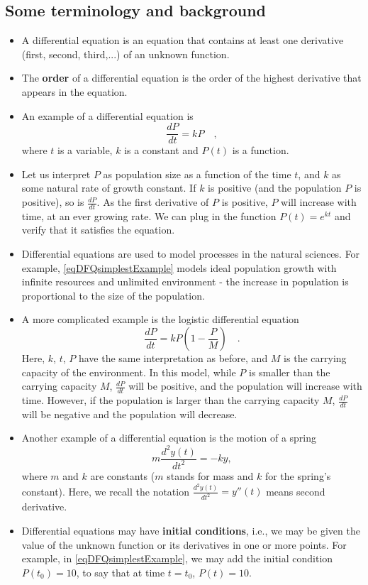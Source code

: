 \documentclass[12pt]{book}
\renewcommand{\emph}{\textbf}
\begin{document}
\subsection{Some terminology and background}
\begin{itemize}
\item A differential equation is an equation that contains at least one derivative (first, second, third,...) of an unknown function. 
\item The \emph{order} of a differential equation is the order of the highest derivative that appears in the equation.
\item An example of a differential equation is
\begin{equation}\label{eqDFQsimplestExample}
\frac{dP}{dt} = k P\quad ,
\end{equation}
where $t$ is a variable, $k$ is a constant and $P(t)$ is a function.
\item Let us interpret $P$ as population size as a function of the time $t$, and $k$ as some natural rate of growth constant. If $k$ is positive (and the population $P$ is positive), so is $\frac{d P}{dt}$. As the first derivative of $P$ is positive, $P$ will increase with time, at an ever growing rate. We can plug in the function $P(t)= e^{k t}$ and verify that it satisfies the equation.
\item Differential equations are used to model processes in the natural sciences. For example, \ref{eqDFQsimplestExample} models ideal population growth with infinite resources and unlimited environment - the increase in population is proportional to the size of the population.
\item A more complicated example is the logistic differential equation 
\[
\frac{d P }{dt} = k P(1- \frac{P}{M})\quad.
\]
Here, $k$, $t$, $P$ have the same interpretation as before, and $M$ is the carrying capacity of the environment. In this model, while $P$ is smaller than the carrying capacity $M$,  $\frac{dP}{dt}$ will be positive, and the population will increase with time. However, if the population is larger than the carrying capacity $M$, $\frac{d P }{dt}$ will be negative and the population will decrease.
\item Another example of a differential equation is the motion of a spring
\[
m\frac{d^2 y (t)}{dt^2}= -k y,
\]
where $m$ and $k$ are constants ($m$ stands for mass and $k$ for the spring's constant). Here, we recall the notation $\frac{d^2 y (t)}{dt^2}= y''(t)$ means second derivative.

\item Differential equations may have \emph{initial conditions}, i.e., we may be given the value of the unknown function or its derivatives in one or more points. For example, in \eqref{eqDFQsimplestExample}, we may add the initial condition $P(t_0)= 10$, to say that at time $t=t_0$, $P(t)=10$. 


\end{itemize}
\end{document}
